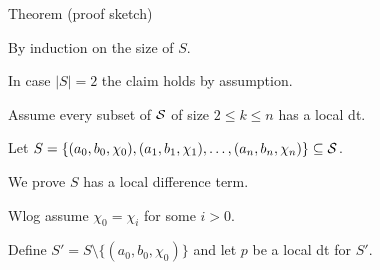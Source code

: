 \documentclass[notes=hide,12pt,xcolor=dvipsnames%
   ]{beamer}
\theoremstyle{definition}
\begin{document}
\begin{frame}[label=local-diff-term-res]{Theorem (proof sketch)}

  By induction on the size of $S$.

  In case $|S| = 2$ the claim holds by assumption.

  Assume every subset of $\mathcal{S}$ of size $2\leq k \leq n$ has a local dt.

  Let $S = \{(a_0, b_0, \chi_0), (a_1, b_1, \chi_1), \dots, (a_{n}, b_{n},\chi_{n})\} \subseteq \mathcal{S}$.
  
  We prove $S$ has a local difference term.

  \pause
  Wlog assume $\chi_0 = \chi_i$ for some $i>0$.


  Define $S' = S \setminus \{(a_0, b_0, \chi_0)\}$ and let $p$ be a local dt for $S'$.

\end{frame}
\end{document}

